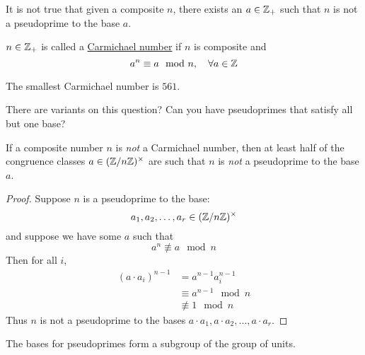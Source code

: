 It is not true that given a composite $n$, there exists an $a\in \mathbb Z_+$ such that $n$ is not a pseudoprime to the base $a$.
\begin{definition}
	$n\in \mathbb Z_+$ is called a \ul{Carmichael number} if $n$ is composite and
	\[a^n\equiv a\mod n,\quad \forall a\in \mathbb Z\]
\end{definition}
\begin{example}
	The smallest Carmichael number is $561$.
\end{example}
\begin{ques*}
	There are variants on this question? Can you have pseudoprimes that satisfy all but one base?
\end{ques*}

\begin{proposition}
	If a composite number $n$ is \emph{not} a Carmichael number, then at least half of the congruence classes $a\in (\mathbb Z/n\mathbb Z)^\times$ are such that $n$ is \emph{not} a pseudoprime to the base $a$.
\end{proposition}
\begin{proof}
	Suppose $n$ is a pseudoprime to the base:
	\[a_1, a_2, \dots, a_r\in (\mathbb Z/n\mathbb Z)^\times\]
	and suppose we have some $a$ such that
	\[a^n \not\equiv a\mod n\]
	Then for all $i$,
	\begin{align*}
		(a\cdot a_i)^{n-1} & = a^{n-1}a_i^{n-1}   \\
		                   & \equiv a^{n-1}\mod n \\
		                   & \not\equiv 1\mod n
	\end{align*}
	Thus $n$ is not a pseudoprime to the bases $a\cdot a_1, a\cdot a_2, \dots, a\cdot a_r$.
\end{proof}
\begin{remark}
	The bases for pseudoprimes form a subgroup of the group of units.
\end{remark}
